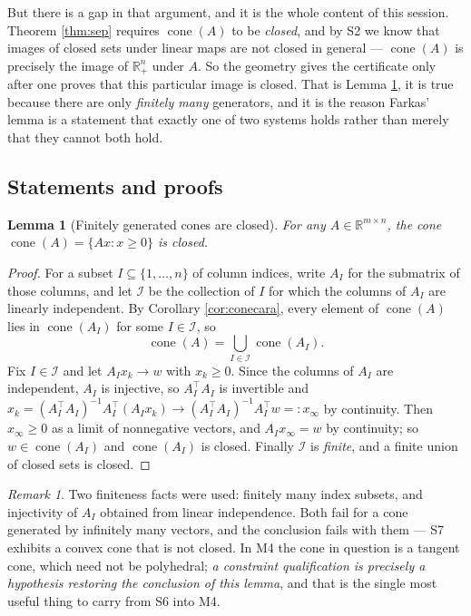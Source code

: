 \documentclass[11pt,a4paper]{article}
\theoremstyle{definition}
\theoremstyle{plain}
\newtheorem{lemma}[theorem]{Lemma}
\theoremstyle{remark}
\newtheorem*{remark}{Remark}
\newcommand{\R}{\mathbb{R}}
\DeclareMathOperator{\cone}{cone}
\begin{document}
But there is a gap in that argument, and it is the whole content of this session. Theorem
\ref{thm:sep} requires $\cone(A)$ to be \emph{closed}, and by S2 we know that images of closed
sets under linear maps are not closed in general --- $\cone(A)$ is precisely the image of
$\R^n_+$ under $A$. So the geometry gives the certificate only after one proves that this
particular image is closed. That is Lemma \ref{lem:closedcone}, it is true because there are
only \emph{finitely many} generators, and it is the reason Farkas' lemma is a statement that
exactly one of two systems holds rather than merely that they cannot both hold.

\subsection*{Statements and proofs}

\begin{lemma}[Finitely generated cones are closed]
\label{lem:closedcone}
For any $A\in\R^{m\times n}$, the cone $\cone(A)=\{Ax:x\ge0\}$ is closed.
\end{lemma}

\begin{proof}
For a subset $I\subseteq\{1,\dots,n\}$ of column indices, write $A_I$ for the submatrix of those
columns, and let $\mathcal I$ be the collection of $I$ for which the columns of $A_I$ are
linearly independent. By Corollary \ref{cor:conecara}, every element of $\cone(A)$ lies in
$\cone(A_I)$ for some $I\in\mathcal I$, so
\[
\cone(A)=\bigcup_{I\in\mathcal I}\cone(A_I) .
\]
Fix $I\in\mathcal I$ and let $A_Ix_k\to w$ with $x_k\ge0$. Since the columns of $A_I$ are
independent, $A_I$ is injective, so $A_I^\top A_I$ is invertible and
$x_k=(A_I^\top A_I)^{-1}A_I^\top(A_Ix_k)\to(A_I^\top A_I)^{-1}A_I^\top w=:x_\infty$ by
continuity. Then $x_\infty\ge0$ as a limit of nonnegative vectors, and $A_Ix_\infty=w$ by
continuity; so $w\in\cone(A_I)$ and $\cone(A_I)$ is closed. Finally $\mathcal I$ is
\emph{finite}, and a finite union of closed sets is closed.
\end{proof}

\begin{remark}
Two finiteness facts were used: finitely many index subsets, and injectivity of $A_I$ obtained
from linear independence. Both fail for a cone generated by infinitely many vectors, and the
conclusion fails with them --- S7 exhibits a convex cone that is not closed. In M4 the cone in
question is a tangent cone, which need not be polyhedral; \emph{a constraint qualification is
precisely a hypothesis restoring the conclusion of this lemma}, and that is the single most
useful thing to carry from S6 into M4.
\end{remark}
\end{document}

